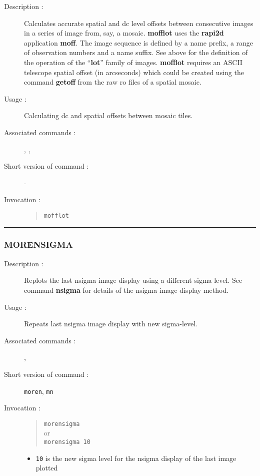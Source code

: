\begin{description}

\item[Description :] Calculates accurate spatial and dc level offsets
between consecutive images in a series of image from, say, a mosaic.
{\bf mofflot} uses the {\bf rapi2d} application {\bf moff}.  The image
sequence is defined by a name prefix, a range of observation numbers
and a name suffix.  See above for the definition of the operation of
the ``{\bf lot}'' family of images.  {\bf mofflot} requires an ASCII
telescope spatial offset (in arcseconds) which could be created using
the command {\bf getoff} from the raw {\sc ro} files of a spatial
mosaic.

\item[Usage :] Calculating dc and spatial offsets between mosaic tiles.
\item[Associated commands :] {\tt {}}, 
{\tt {}}, {\tt {}}
\item[Short version of command :] -
\item[Invocation :]

\begin{quote}{\tt  mofflot }\end{quote}

\end{description}

\hrule 
\subsubsection*{\label{MORENSIGMA}MORENSIGMA}

\begin{description}

\item[Description :] Replots the last nsigma image display using a
different sigma level.  See command {\bf nsigma} for details of the nsigma
image display method.

\item[Usage :] Repeats last nsigma image display with new sigma-level.
\item[Associated commands :] {\tt {}}, 
{\tt {}}
\item[Short version of command :] {\tt moren}, {\tt mn}
\item[Invocation :]

\begin{quote}{\tt  morensigma }\\
or \\
{\tt morensigma 10 }
\end{quote}

\begin{itemize}

\item {\tt 10} is the new sigma level for the nsigma display of the last
image plotted
\end{itemize}

\end{description}


